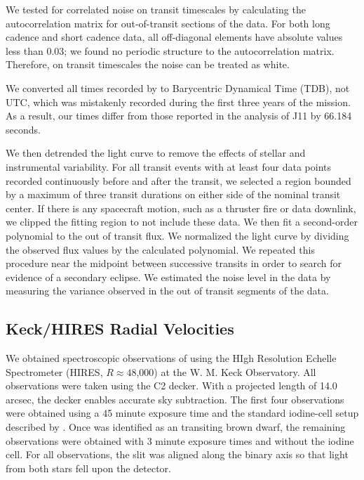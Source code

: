 We tested for correlated noise on transit timescales by calculating the autocorrelation matrix for out-of-transit sections of the data. For both long cadence and short cadence data, all off-diagonal elements have absolute values less than 0.03; we found no periodic structure to the autocorrelation matrix. 
Therefore, on transit timescales the noise can be treated as white.

We converted all times recorded by \itk{} to Barycentric Dynamical Time (TDB), not UTC, which was mistakenly recorded during the first three years of the mission. 
As a result, our times differ from those reported in the analysis of J11 by 66.184 seconds.

We then detrended the light curve to remove the effects of stellar and instrumental variability. 
For all transit events with at least four data points recorded continuously before and after the transit, we selected a region bounded by a maximum of three transit durations on either side of the nominal transit center.
If there is any spacecraft motion, such as a thruster fire or data downlink, we clipped the fitting region to not include these data.
We then fit a second-order polynomial to the out of transit flux. 
We normalized the light curve by dividing the observed flux values by the calculated polynomial. 
We repeated this procedure near the midpoint between successive transits in order to search for evidence of a secondary eclipse. 
We estimated the noise level in the data by measuring the variance observed in the out of transit segments of the data.

\subsection{Keck/HIRES Radial Velocities}

We obtained spectroscopic observations of \LHS{} using the HIgh Resolution Echelle Spectrometer (HIRES, $R \approx 48$,000) at the W. M. Keck Observatory. 
All observations were taken using the C2 decker. 
With a projected length of 14.0 arcsec, the decker enables accurate sky subtraction. 
The first four observations were obtained using a 45 minute exposure time and the standard iodine-cell setup described by \citet{Howard10}. 
Once \LC{} was identified as an transiting brown dwarf, the remaining observations were obtained with 3 minute exposure times and without the iodine cell.
For all observations, the slit was aligned along the binary axis so that light from both stars fell upon the detector. 

